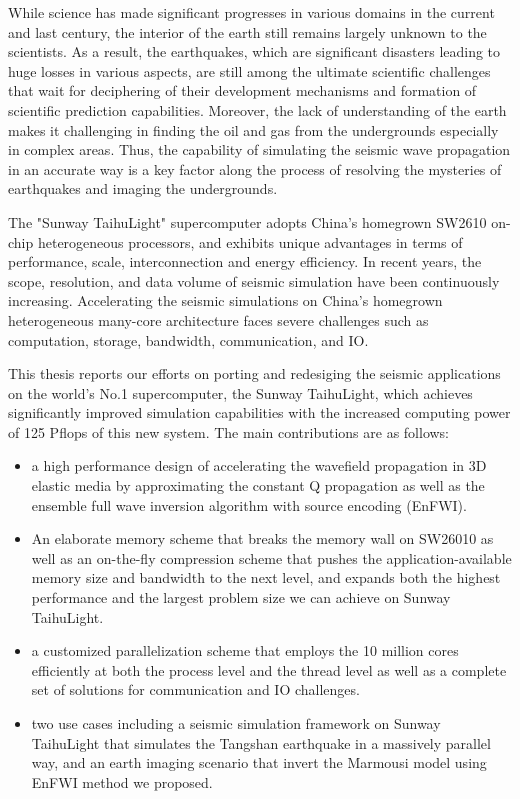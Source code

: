 \begin{eabstract}
  While science has made significant progresses in various domains in the current and last century, the interior of the earth still remains largely unknown to the scientists. As a result, the earthquakes, which are significant disasters leading to huge losses in various aspects, are still among the ultimate scientific challenges that wait for deciphering of their development mechanisms and formation of scientific prediction capabilities. Moreover, the lack of understanding of the earth makes it challenging in finding the oil and gas from the undergrounds especially in complex areas.  Thus, the capability of simulating the seismic wave propagation in an accurate way is a key factor along the process of resolving the mysteries of earthquakes and imaging the undergrounds. 

  The "Sunway TaihuLight" supercomputer adopts China's homegrown SW2610 on-chip heterogeneous processors, and exhibits unique advantages in terms of performance, scale, interconnection and energy efficiency. In recent years, the scope, resolution, and data volume of seismic simulation have been continuously increasing. Accelerating the seismic simulations on China's homegrown heterogeneous many-core architecture faces severe challenges such as computation, storage, bandwidth, communication, and IO. 

  This thesis reports our efforts on porting and redesiging the seismic applications on the world's No.1 supercomputer, the Sunway TaihuLight, which achieves significantly improved simulation capabilities with the increased computing power of 125 Pflops of this new system. The main contributions are as follows:

\begin{itemize}
  \item a high performance design of accelerating the wavefield propagation in 3D elastic media by approximating the constant Q propagation as well as the ensemble full wave inversion algorithm with source encoding (EnFWI). 

  \item An elaborate memory scheme that breaks the memory wall on SW26010 as well as an on-the-fly compression scheme that pushes the application-available memory size and bandwidth to the next level, and expands both the highest performance and the largest problem size we can achieve on Sunway TaihuLight.

  \item a customized parallelization scheme that employs the 10 million cores efficiently at both the process level and the thread level as well as a complete set of solutions for communication and IO challenges.

  \item two use cases including a seismic simulation framework on Sunway TaihuLight that simulates the Tangshan earthquake in a massively parallel way, and an earth imaging scenario that invert the Marmousi model using EnFWI method we proposed. 

\end{itemize}

\end{eabstract}

